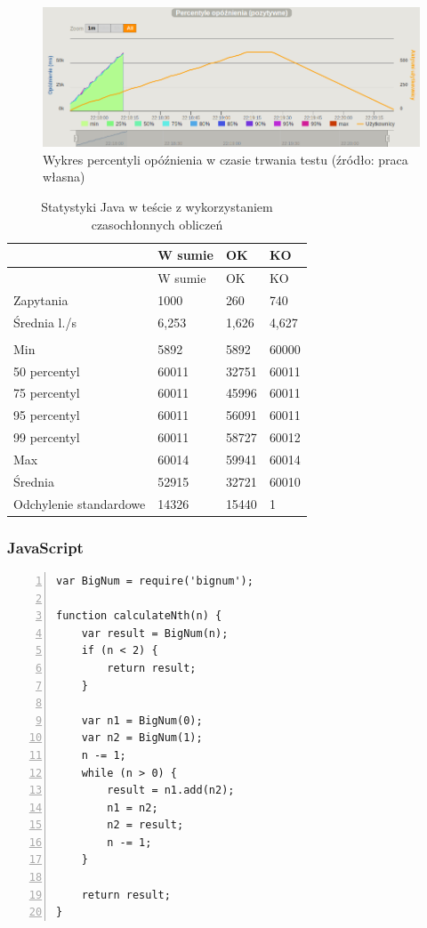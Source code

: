 \documentclass[12pt,twoside]{article}
\begin{document}
\begin{figure}[htbp]
\centering
\includegraphics[resolution=150]{test_results/java/fibonacci/screenshots/latency_percentile.png}
\caption{Wykres percentyli opóźnienia w czasie trwania testu (źródło: praca własna)}
\end{figure}

\begin{longtable}[c]{@{}llll@{}}
\caption{Statystyki Java w teście z wykorzystaniem czasochłonnych
obliczeń}\tabularnewline
\toprule
& W sumie & OK & KO\tabularnewline
\midrule
\endfirsthead
\toprule
& W sumie & OK & KO\tabularnewline
\midrule
\endhead
Zapytania & 1000 & 260 & 740\tabularnewline
Średnia l./s & 6,253 & 1,626 & 4,627\tabularnewline
& & &\tabularnewline
Min & 5892 & 5892 & 60000\tabularnewline
50 percentyl & 60011 & 32751 & 60011\tabularnewline
75 percentyl & 60011 & 45996 & 60011\tabularnewline
95 percentyl & 60011 & 56091 & 60011\tabularnewline
99 percentyl & 60011 & 58727 & 60012\tabularnewline
Max & 60014 & 59941 & 60014\tabularnewline
Średnia & 52915 & 32721 & 60010\tabularnewline
Odchylenie standardowe & 14326 & 15440 & 1\tabularnewline
\bottomrule
\end{longtable}

\clearpage

\subsubsection{JavaScript}\label{javascript-1}

\begin{lstlisting}[numbers=left, caption=JavaScript - obliczanie n-tego elementu ciągu Fibonacciego]
var BigNum = require('bignum');

function calculateNth(n) {
    var result = BigNum(n);
    if (n < 2) {
        return result;
    }

    var n1 = BigNum(0);
    var n2 = BigNum(1);
    n -= 1;
    while (n > 0) {
        result = n1.add(n2);
        n1 = n2;
        n2 = result;
        n -= 1;
    }

    return result;
}
\end{lstlisting}
\end{document}
